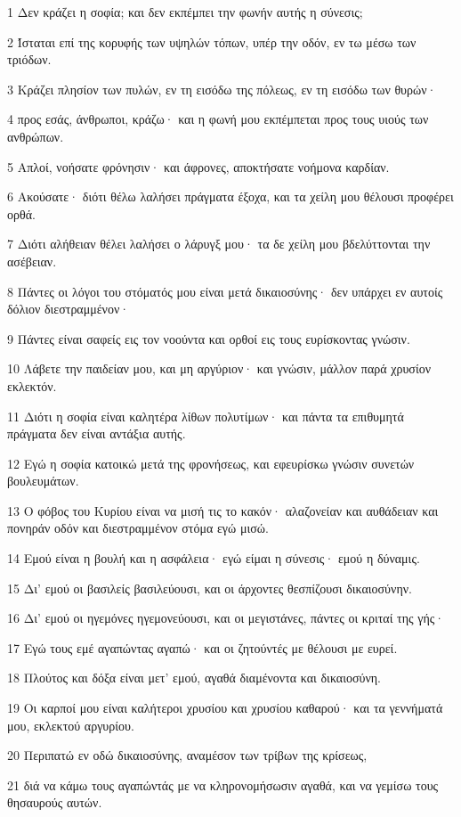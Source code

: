 \par 1 Δεν κράζει η σοφία; και δεν εκπέμπει την φωνήν αυτής η σύνεσις;
\par 2 Ίσταται επί της κορυφής των υψηλών τόπων, υπέρ την οδόν, εν τω μέσω των τριόδων.
\par 3 Κράζει πλησίον των πυλών, εν τη εισόδω της πόλεως, εν τη εισόδω των θυρών·
\par 4 προς εσάς, άνθρωποι, κράζω· και η φωνή μου εκπέμπεται προς τους υιούς των ανθρώπων.
\par 5 Απλοί, νοήσατε φρόνησιν· και άφρονες, αποκτήσατε νοήμονα καρδίαν.
\par 6 Ακούσατε· διότι θέλω λαλήσει πράγματα έξοχα, και τα χείλη μου θέλουσι προφέρει ορθά.
\par 7 Διότι αλήθειαν θέλει λαλήσει ο λάρυγξ μου· τα δε χείλη μου βδελύττονται την ασέβειαν.
\par 8 Πάντες οι λόγοι του στόματός μου είναι μετά δικαιοσύνης· δεν υπάρχει εν αυτοίς δόλιον διεστραμμένον·
\par 9 Πάντες είναι σαφείς εις τον νοούντα και ορθοί εις τους ευρίσκοντας γνώσιν.
\par 10 Λάβετε την παιδείαν μου, και μη αργύριον· και γνώσιν, μάλλον παρά χρυσίον εκλεκτόν.
\par 11 Διότι η σοφία είναι καλητέρα λίθων πολυτίμων· και πάντα τα επιθυμητά πράγματα δεν είναι αντάξια αυτής.
\par 12 Εγώ η σοφία κατοικώ μετά της φρονήσεως, και εφευρίσκω γνώσιν συνετών βουλευμάτων.
\par 13 Ο φόβος του Κυρίου είναι να μισή τις το κακόν· αλαζονείαν και αυθάδειαν και πονηράν οδόν και διεστραμμένον στόμα εγώ μισώ.
\par 14 Εμού είναι η βουλή και η ασφάλεια· εγώ είμαι η σύνεσις· εμού η δύναμις.
\par 15 Δι' εμού οι βασιλείς βασιλεύουσι, και οι άρχοντες θεσπίζουσι δικαιοσύνην.
\par 16 Δι' εμού οι ηγεμόνες ηγεμονεύουσι, και οι μεγιστάνες, πάντες οι κριταί της γής·
\par 17 Εγώ τους εμέ αγαπώντας αγαπώ· και οι ζητούντές με θέλουσι με ευρεί.
\par 18 Πλούτος και δόξα είναι μετ' εμού, αγαθά διαμένοντα και δικαιοσύνη.
\par 19 Οι καρποί μου είναι καλήτεροι χρυσίου και χρυσίου καθαρού· και τα γεννήματά μου, εκλεκτού αργυρίου.
\par 20 Περιπατώ εν οδώ δικαιοσύνης, αναμέσον των τρίβων της κρίσεως,
\par 21 διά να κάμω τους αγαπώντάς με να κληρονομήσωσιν αγαθά, και να γεμίσω τους θησαυρούς αυτών.
